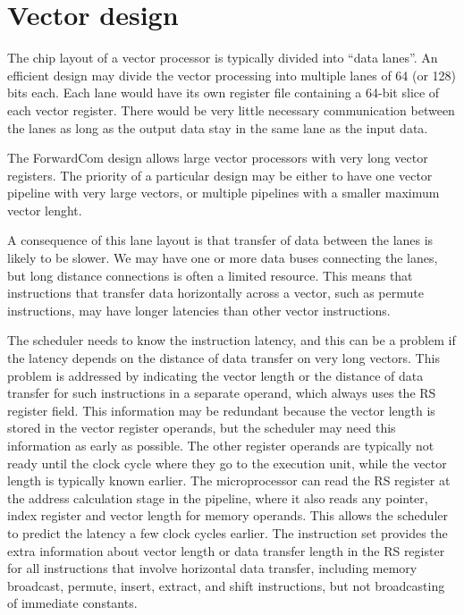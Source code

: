 \documentclass[forwardcom.tex]{subfiles}
\begin{document}
\section{Vector design}\label{vectorDesign}
The chip layout of a vector processor is typically divided into ``data lanes''. 
An efficient design may divide the vector processing into multiple lanes of 64 (or 128) bits each. Each lane would have its own register file containing a 64-bit slice of each vector register. There would be very little necessary communication between the lanes as long as the output data stay in the same lane as the input data. 
\vspace{2mm}

The ForwardCom design allows large vector processors with very long vector registers. The priority of a particular design may be either to have one vector pipeline with very large vectors, or multiple pipelines with a smaller maximum vector lenght.
\vspace{2mm}

A consequence of this lane layout is that transfer of data between the lanes is likely to be slower. We may have one or more data buses connecting the lanes, but long distance connections is often a limited resource.
This means that instructions that transfer data horizontally across a vector, such as permute instructions, may have longer latencies than other vector instructions. 
\vspace{2mm}

The scheduler needs to know the instruction latency, and this can be a problem if the latency depends on the distance of data transfer on very long vectors. This problem is addressed by indicating the vector length or the distance of data transfer for such instructions in a separate operand, which always uses the RS register field. This information may be redundant because the vector length is stored in the vector register operands, but the scheduler may need this information as early as possible. The other register operands are typically not ready until the clock cycle where they go to the execution unit, while the vector length is typically known earlier. The microprocessor can read the RS register at the address calculation stage in the pipeline, where it also reads any pointer, index register and vector length for memory operands. This allows the scheduler to predict the latency a few clock cycles earlier. The instruction set provides the extra information about vector length or data transfer length in the RS register for all instructions that involve horizontal data transfer, including memory broadcast, permute, insert, extract, and shift instructions, but not broadcasting of immediate constants. 
\vspace{2mm}
\end{document}
